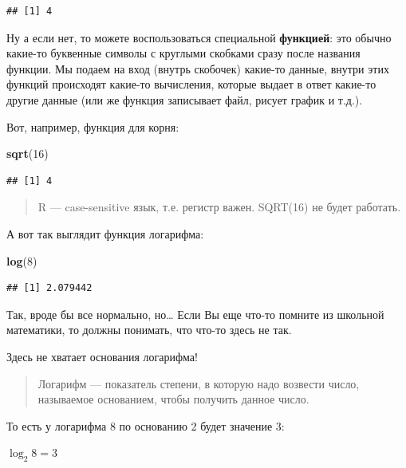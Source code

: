 \documentclass[]{book}
\newenvironment{Shaded}{\begin{snugshade}}{\end{snugshade}}
\newcommand{\KeywordTok}[1]{\textcolor[rgb]{0.13,0.29,0.53}{\textbf{#1}}}
\newcommand{\DecValTok}[1]{\textcolor[rgb]{0.00,0.00,0.81}{#1}}
\newcommand{\NormalTok}[1]{#1}
\begin{document}
\begin{verbatim}
## [1] 4
\end{verbatim}

Ну а если нет, то можете воспользоваться специальной \textbf{функцией}:
это обычно какие-то буквенные символы с круглыми скобками сразу после
названия функции. Мы подаем на вход (внутрь скобочек) какие-то данные,
внутри этих функций происходят какие-то вычисления, которые выдает в
ответ какие-то другие данные (или же функция записывает файл, рисует
график и т.д.).

Вот, например, функция для корня:

\begin{Shaded}
\begin{Highlighting}[]
\KeywordTok{sqrt}\NormalTok{(}\DecValTok{16}\NormalTok{)}
\end{Highlighting}
\end{Shaded}

\begin{verbatim}
## [1] 4
\end{verbatim}

\begin{quote}
R --- case-sensitive язык, т.е. регистр важен. SQRT(16) не будет
работать.
\end{quote}

А вот так выглядит функция логарифма:

\begin{Shaded}
\begin{Highlighting}[]
\KeywordTok{log}\NormalTok{(}\DecValTok{8}\NormalTok{)}
\end{Highlighting}
\end{Shaded}

\begin{verbatim}
## [1] 2.079442
\end{verbatim}

Так, вроде бы все нормально, но\ldots{} Если Вы еще что-то помните из
школьной математики, то должны понимать, что что-то здесь не так.

Здесь не хватает основания логарифма!

\begin{quote}
Логарифм --- показатель степени, в которую надо возвести число,
называемое основанием, чтобы получить данное число.
\end{quote}

То есть у логарифма 8 по основанию 2 будет значение 3:

\(\log_2 8 = 3\)
\end{document}
